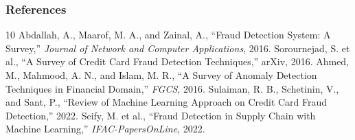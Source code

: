 \documentclass{beamer}
\begin{document}
\begin{frame}
\frametitle{References}
\scriptsize
\begin{thebibliography}{10}
 Abdallah, A., Maarof, M. A., and Zainal, A., ``Fraud Detection System: A Survey,'' \textit{Journal of Network and Computer Applications}, 2016.
 Sorournejad, S. et al., ``A Survey of Credit Card Fraud Detection Techniques,'' arXiv, 2016.
 Ahmed, M., Mahmood, A. N., and Islam, M. R., ``A Survey of Anomaly Detection Techniques in Financial Domain,'' \textit{FGCS}, 2016.
 Sulaiman, R. B., Schetinin, V., and Sant, P., ``Review of Machine Learning Approach on Credit Card Fraud Detection,'' 2022.
 Seify, M. et al., ``Fraud Detection in Supply Chain with Machine Learning,'' \textit{IFAC-PapersOnLine}, 2022.
\end{thebibliography}
\end{frame}
\end{document}
